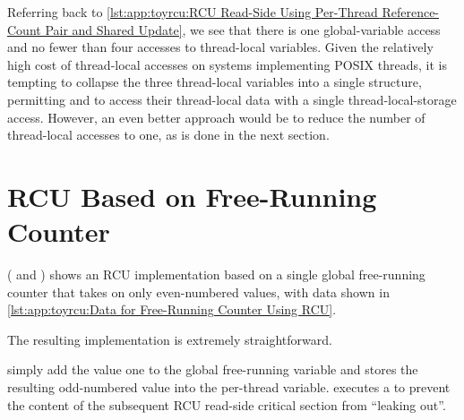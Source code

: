 Referring back to
\cref{lst:app:toyrcu:RCU Read-Side Using Per-Thread Reference-Count Pair and Shared Update},
we see that there is one global-variable access and no fewer than four
accesses to thread-local variables.
Given the relatively high cost of thread-local accesses on systems
implementing POSIX threads, it is tempting to collapse the three
thread-local variables into a single structure, permitting
 and  to access their
thread-local data with a single thread-local-storage access.
However, an even better approach would be to reduce the number of
thread-local accesses to one, as is done in the next section.

\section{RCU Based on Free-Running Counter}
\label{sec:app:toyrcu:RCU Based on Free-Running Counter}

( and )
shows an RCU implementation based on a single global free-running counter
that takes on only even-numbered values, with data shown in
\cref{lst:app:toyrcu:Data for Free-Running Counter Using RCU}.

\begin{listing}

\caption{Data for Free-Running Counter Using RCU}
\label{lst:app:toyrcu:Data for Free-Running Counter Using RCU}
\end{listing}

\begin{listing}
\vspace*{-11pt}
\caption{Free-Running Counter Using RCU}
\label{lst:app:toyrcu:Free-Running Counter Using RCU}
\end{listing}

The resulting  implementation is extremely
straightforward.
\begin{fcvref}
 simply
add the value one to the global free-running 
variable and stores the resulting odd-numbered value into the
 per-thread variable.
 executes a  to prevent the content of the
subsequent RCU read-side critical section from ``leaking out''.
\end{fcvref}

